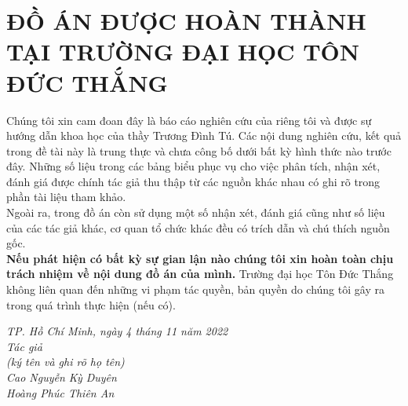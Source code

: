 \documentclass[a4paper, 12pt]{article}
\begin{document}
\cleardoublepage

\section*{ĐỒ ÁN ĐƯỢC HOÀN THÀNH\\
TẠI TRƯỜNG ĐẠI HỌC TÔN ĐỨC THẮNG}
\thispagestyle{empty}
\hspace*{0.25cm}Chúng tôi xin cam đoan đây là báo cáo nghiên cứu của riêng tôi và được sự hướng dẫn khoa học của thầy Trương Đình Tú. Các nội dung nghiên cứu, kết quả trong đề tài này là trung thực và chưa công bố dưới bất kỳ hình thức nào trước đây. Những số liệu trong các bảng biểu phục vụ cho việc phân tích, nhận xét, đánh giá được chính tác giả thu thập từ các nguồn khác nhau có ghi rõ trong phần tài liệu tham khảo.\\
\hspace*{1cm}Ngoài ra, trong đồ án còn sử dụng một số nhận xét, đánh giá cũng như số liệu của các tác giả khác, cơ quan tổ chức khác đều có trích dẫn và chú thích nguồn gốc.\\
\textbf{\hspace*{1cm}Nếu phát hiện có bất kỳ sự gian lận nào chúng tôi xin hoàn toàn chịu trách nhiệm về nội dung đồ án của mình.} Trường đại học Tôn Đức Thắng không liên quan đến những vi phạm tác quyền, bản quyền do chúng tôi gây ra trong quá trình thực hiện (nếu có).
\begin{flushright}
\textit{TP. Hồ Chí Minh, ngày 4 tháng 11 năm 2022}\\[0.25cm]   
\textit{Tác giả \hspace*{3.5cm}}      \\[0.25cm]
	\textit{(ký tên và ghi rõ họ tên)\hspace*{2cm}} \\[1.5cm]
	\textit{Cao Nguyễn Kỳ Duyên\hspace*{2.25cm}} \\[0.5cm]
	\textit{Hoàng Phúc Thiên An\hspace*{2.5cm}} \\[0.5cm]
\end{flushright}
\cleardoublepage



\tableofcontents %
\thispagestyle{empty}
\cleardoublepage

\end{document}
